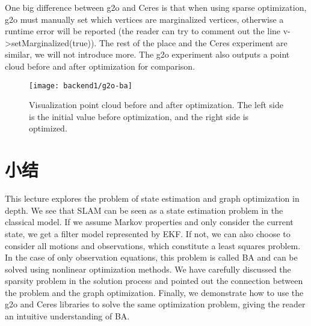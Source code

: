One big difference between g2o and Ceres is that when using sparse optimization, g2o must manually set which vertices are marginalized vertices, otherwise a runtime error will be reported (the reader can try to comment out the line v->setMarginalized(true)). The rest of the place and the Ceres experiment are similar, we will not introduce more. The g2o experiment also outputs a point cloud before and after optimization for comparison.

\begin{figure}[!htp]
\centering
\texttt{[image: backend1/g2o-ba]}
\caption{Visualization point cloud before and after optimization. The left side is the initial value before optimization, and the right side is optimized. }
\label{fig:g2o-BA}
\end{figure}

\section{小结}
This lecture explores the problem of state estimation and graph optimization in depth. We see that SLAM can be seen as a state estimation problem in the classical model. If we assume Markov properties and only consider the current state, we get a filter model represented by EKF. If not, we can also choose to consider all motions and observations, which constitute a least squares problem. In the case of only observation equations, this problem is called BA and can be solved using nonlinear optimization methods. We have carefully discussed the sparsity problem in the solution process and pointed out the connection between the problem and the graph optimization. Finally, we demonstrate how to use the g2o and Ceres libraries to solve the same optimization problem, giving the reader an intuitive understanding of BA.

